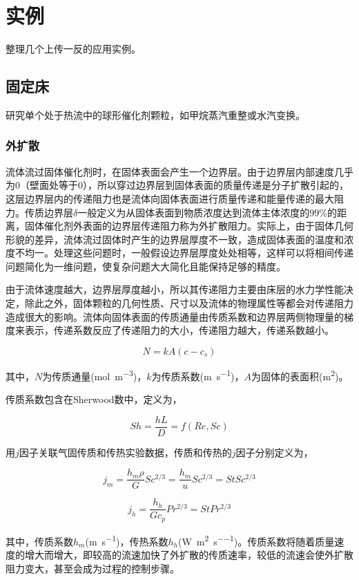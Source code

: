 \chapter{实例}

整理几个上传一反的应用实例。

\section{固定床}

研究单个处于热流中的球形催化剂颗粒，如甲烷蒸汽重整或水汽变换。

\subsection{外扩散}

流体流过固体催化剂时，在固体表面会产生一个边界层。由于边界层内部速度几乎为0（壁面处等于0），所以穿过边界层到固体表面的质量传递是分子扩散引起的，这层边界层内的传递阻力也是流体向固体表面进行质量传递和能量传递的最大阻力。传质边界层$ \delta $一般定义为从固体表面到物质浓度达到流体主体浓度的99\%的距离，固体催化剂外表面的边界层传递阻力称为外扩散阻力。实际上，由于固体几何形貌的差异，流体流过固体时产生的边界层厚度不一致，造成固体表面的温度和浓度不均一。处理这些问题时，一般假设边界层厚度处处相等，这样可以将相间传递问题简化为一维问题，使复杂问题大大简化且能保持足够的精度。

由于流体速度越大，边界层厚度越小，所以其传递阻力主要由床层的水力学性能决定，除此之外，固体颗粒的几何性质、尺寸以及流体的物理属性等都会对传递阻力造成很大的影响。流体向固体表面的传质通量由传质系数和边界层两侧物理量的梯度来表示，传递系数反应了传递阻力的大小，传递阻力越大，传递系数越小。

\[ N=kA(c-c_s) \]

其中，$ N $为传质通量(\si{\mole\per\meter\cubed})，$ k $为传质系数(\si{\meter\per\second})，$ A $为固体的表面积(\si{\meter\squared})。

传质系数包含在Sherwood数中，定义为，

\[ Sh = \frac{hL}{D} = f(Re, Sc)\]

用$ j $因子关联气固传质和传热实验数据，传质和传热的$ j $因子分别定义为，

\[ j_m = \frac{h_m\rho}{G}Sc^{2/3}=\frac{h_m}{u}Sc^{2/3}=StSc^{2/3} \]

\[ j_h = \frac{h_h}{Gc_p}Pr^{2/3} =StPr^{2/3}\]


其中，传质系数$ h_m $(\si{\meter\per\second})，传热系数$ h_h $(\si{\watt\per\meter\squared\per\second})。传质系数将随着质量速度的增大而增大，即较高的流速加快了外扩散的传质速率，较低的流速会使外扩散阻力变大，甚至会成为过程的控制步骤。

